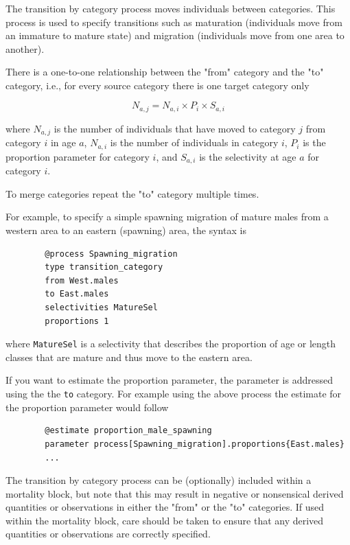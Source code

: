 \subsubsection{}\label{sec:Process-TransitionCategory}\label{sec:Process-Maturation}

The transition by category process moves individuals between categories. This process is used to specify transitions such as maturation (individuals move from an immature to mature state) and migration (individuals move from one area to another).

There is a one-to-one relationship between the "from" category and the "to" category, i.e., for every source category there is one target category only

\begin{equation}
	N_{a,j} = N_{a,i} \times P_i \times S_{a,i}
\end{equation}

where $N_{a,j}$ is the number of individuals that have moved to category $j$ from category $i$ in age $a$, $N_{a,i}$ is the number of individuals in category $i$, $P_i$ is the proportion parameter for category $i$, and $S_{a,i}$ is the selectivity at age $a$ for category $i$.

To merge categories repeat the "to" category multiple times.

For example, to specify a simple spawning migration of mature males from a western area to an eastern (spawning) area, the syntax is

{\small{\begin{verbatim}
		@process Spawning_migration
		type transition_category
		from West.males
		to East.males
		selectivities MatureSel
		proportions 1
		\end{verbatim}}}

where \texttt{MatureSel} is a selectivity that describes the proportion of age or length classes that are mature and thus move to the eastern area.

If you want to estimate the proportion parameter, the parameter is addressed using the the \texttt{to} category. For example using the above process the estimate for the proportion parameter would follow

{\small{\begin{verbatim}
		@estimate proportion_male_spawning
		parameter process[Spawning_migration].proportions{East.males}
		...
\end{verbatim}}}

The transition by category process can be (optionally) included within a mortality block, but note that this may result in negative or nonsensical derived quantities or observations in either the "from" or the "to" categories. If used within the mortality block, care should be taken to ensure that any derived quantities or observations are correctly specified.

